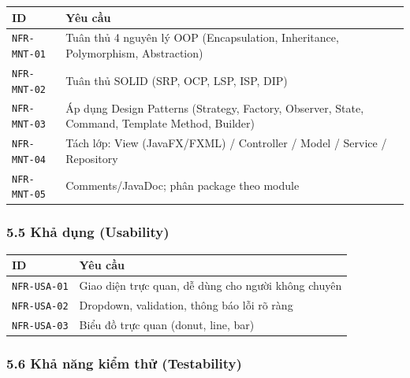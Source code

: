 \documentclass[11pt,a4paper]{article}
\newcounter{none}
\newcommand{\faintline}{\noalign{\global\arrayrulecolor{faintgray}}\hline\noalign{\global\arrayrulecolor{black}}} %
\begin{document}
{\def\LTcaptype{none}
\begin{longtable}[]{@{}
  >{\raggedright\arraybackslash}p{}
  >{\raggedright\arraybackslash}p{}@{}}
\toprule\noalign{}
\begin{minipage}[b]{\linewidth}\raggedright
ID
\end{minipage} & \begin{minipage}[b]{\linewidth}\raggedright
Yêu cầu
\end{minipage} \\
\midrule\noalign{}
\endhead
\bottomrule\noalign{}
\endlastfoot
\texttt{NFR-MNT-01} & Tuân thủ 4 nguyên lý OOP (Encapsulation, Inheritance, Polymorphism, Abstraction) \\ \faintline
\texttt{NFR-MNT-02} & Tuân thủ SOLID (SRP, OCP, LSP, ISP, DIP) \\ \faintline
\texttt{NFR-MNT-03} & Áp dụng Design Patterns (Strategy, Factory, Observer, State, Command, Template Method, Builder) \\ \faintline
\texttt{NFR-MNT-04} & Tách lớp: View (JavaFX/FXML) / Controller / Model / Service / Repository \\ \faintline
\texttt{NFR-MNT-05} & Comments/JavaDoc; phân package theo module \\
\end{longtable}
}

\subsubsection{5.5 Khả dụng (Usability)}\label{khux1ea3-dux1ee5ng-usability}

{\def\LTcaptype{none}
\begin{longtable}[]{@{}
  >{\raggedright\arraybackslash}p{}
  >{\raggedright\arraybackslash}p{}@{}}
\toprule\noalign{}
ID & Yêu cầu \\
\midrule\noalign{}
\endhead
\bottomrule\noalign{}
\endlastfoot
\texttt{NFR-USA-01} & Giao diện trực quan, dễ dùng cho người không chuyên \\ \faintline
\texttt{NFR-USA-02} & Dropdown, validation, thông báo lỗi rõ ràng \\ \faintline
\texttt{NFR-USA-03} & Biểu đồ trực quan (donut, line, bar) \\
\end{longtable}
}

\subsubsection{5.6 Khả năng kiểm thử (Testability)}\label{khux1ea3-nux103ng-kiux1ec3m-thux1eed-testability}
\end{document}
